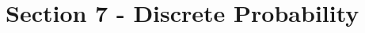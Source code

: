 \documentclass[../../Main.tex]{subfiles}
\begin{document}
\chapter{Section 7 - Discrete Probability}

% 


\setcounter{section}{3}


\end{document}
